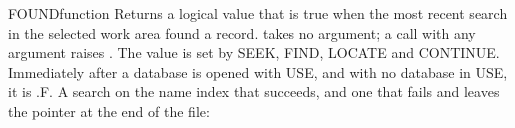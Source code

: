 \begin{XbaseEntry}{FOUND}{function}
Returns a logical value that is true when the most recent search in the selected work area found a record.
\Syntax
{}
\Usage
{} takes no argument; a call with any argument raises . The value is set by SEEK, FIND, LOCATE and CONTINUE. Immediately after a database is opened with USE, and with no database in USE, it is .F.
\Examples
A search on the name index that succeeds, and one that fails and leaves the pointer at the end of the file:
\end{XbaseEntry}


